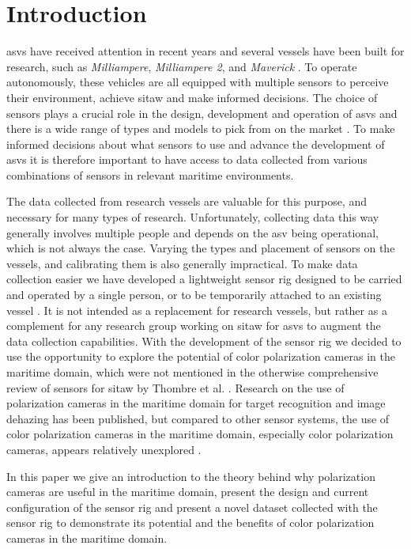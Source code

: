 \section{Introduction}
\glspl{asv} have received attention in recent years and several vessels have been built for research, such as \textit{Milliampere}, \textit{Milliampere 2}, and \textit{Maverick} \cite{brekkeMilliAmpereAutonomousFerry2022}\cite{zhangDesignBuildAutonomous2023}\cite{eideAutonomousUrbanPassengerInReview}.
To operate autonomously, these vehicles are all equipped with multiple sensors to perceive their environment, achieve \gls{sitaw} and make informed decisions.
The choice of sensors plays a crucial role in the design, development and operation of \glspl{asv} and there is a wide range of types and models to pick from on the market \cite{thombreSensorsAITechniques2022}.
To make informed decisions about what sensors to use and advance the development of \glspl{asv} it is therefore important to have access to data collected from various combinations of sensors in relevant maritime environments.

The data collected from research vessels are valuable for this purpose, and necessary for many types of research.
Unfortunately, collecting data this way generally involves multiple people and depends on the \gls{asv} being operational, which is not always the case.
Varying the types and placement of sensors on the vessels, and calibrating them is also generally impractical.
To make data collection easier we have developed a lightweight sensor rig designed to be carried and operated by a single person, or to be temporarily attached to an existing vessel \cite{martensPavingWayEnhanced2023}.
It is not intended as a replacement for research vessels, but rather as a complement for any research group working on \gls{sitaw} for \glspl{asv} to augment the data collection capabilities.
With the development of the sensor rig we decided to use the opportunity to explore the potential of color polarization cameras in the maritime domain, which were not mentioned in the otherwise comprehensive review of sensors for \gls{sitaw} by Thombre et al. \cite{thombreSensorsAITechniques2022}.
Research on the use of polarization cameras in the maritime domain for target recognition and image dehazing has been published, but compared to other sensor systems, the use of color polarization cameras in the maritime domain, especially color polarization cameras, appears relatively unexplored \cite{zhongPolarizationintensityJointImaging2023}\cite{maPolarizationBasedMethodMaritime2024}.

In this paper we give an introduction to the theory behind why polarization cameras are useful in the maritime domain, present the design and current configuration of the sensor rig and present a novel dataset collected with the sensor rig to demonstrate its potential and the benefits of color polarization cameras in the maritime domain.

